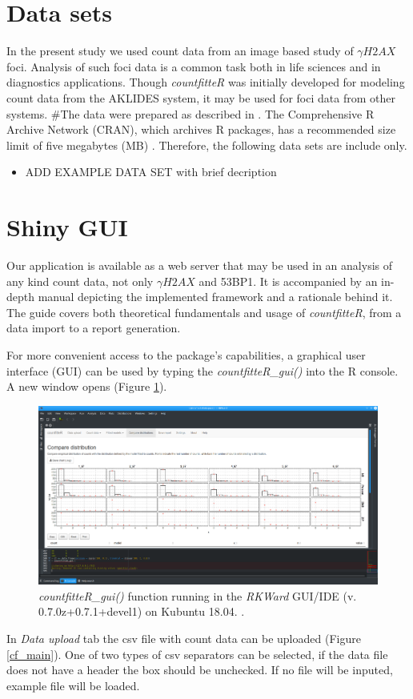 \section{Data sets}
In the present study we used count data from an image based study of $\gamma H2AX$ foci. Analysis of such foci data is a common task both in life sciences and in diagnostics applications. Though \emph{countfitteR} was initially developed for modeling count data from the AKLIDES system, it may be used for foci data from other systems.
#The data were prepared as described in \citep{rodiger_quantification_2018}. The Comprehensive R Archive Network (CRAN), which archives R packages, has a recommended size limit of five megabytes (MB) \citep{anderson_hosting_2017}. Therefore, the following data sets are include only.

\begin{itemize}
 \item ADD EXAMPLE DATA SET with brief decription
\end{itemize}


\section{Shiny GUI} %

Our application is available as a web server that may be used in an analysis of any kind count data, not only $\gamma H2AX$ and 53BP1. It is accompanied by an in-depth manual depicting the implemented framework and a rationale behind it. The guide covers both theoretical fundamentals and usage of \emph{countfitteR}, from a data import to a report generation.

For more convenient access to the package’s capabilities, a graphical user interface (GUI) can be used by typing the \emph{countfitteR\_gui()} into the R console. A new window opens (Figure \ref{fig_gui}). 

\begin{figure}[htbp]
  \centering
  \includegraphics[width=0.99\columnwidth]{fig_gui}
  \caption{\emph{countfitteR\_gui()} function running in the \emph{RKWard} GUI/IDE (v. 0.7.0z+0.7.1+devel1) on Kubuntu 18.04. \citep{rodiger_rkward:_2012}.}
  \label{fig_gui}
\end{figure}
In \textit{Data upload} tab the csv file with count data can be uploaded (Figure \ref{cf_main}). One of two types of csv separators can be selected, if the data file does not have a header the box should be unchecked. If no file will be inputed, example file will be loaded.

